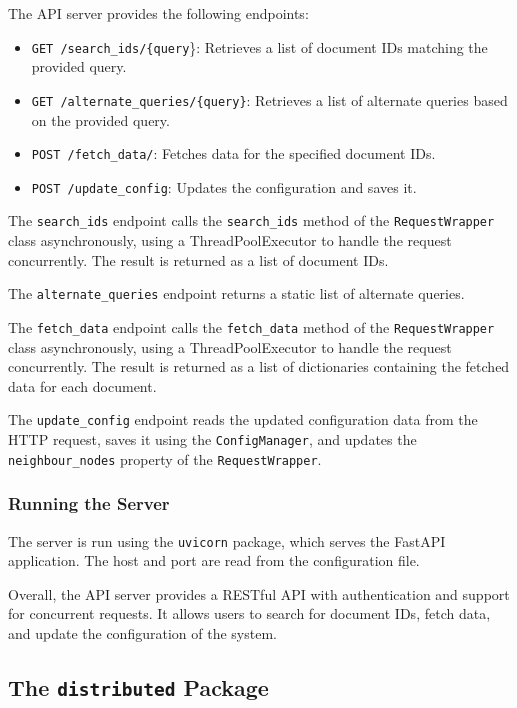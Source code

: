 \documentclass{article}
\begin{document}
The API server provides the following endpoints:

\begin{itemize}
    \item \texttt{GET /search\_ids/\{query}\}: Retrieves a list of document IDs matching the 
    provided query.
    \item \texttt{GET /alternate\_queries/\{query\}}: Retrieves a list of alternate queries 
    based on the provided query.
    \item \texttt{POST /fetch\_data/}: Fetches data for the specified document IDs.
    \item \texttt{POST /update\_config}: Updates the configuration and saves it.
\end{itemize}

The \texttt{search\_ids} endpoint calls the \texttt{search\_ids} method of the 
\texttt{RequestWrapper} class asynchronously, using a ThreadPoolExecutor to handle the request 
concurrently. The result is returned as a list of document IDs.

The \texttt{alternate\_queries} endpoint returns a static list of alternate queries.

The \texttt{fetch\_data} endpoint calls the \texttt{fetch\_data} method of the 
\texttt{RequestWrapper} class asynchronously, using a ThreadPoolExecutor to handle the request 
concurrently. The result is returned as a list of dictionaries containing the fetched data for 
each document.

The \texttt{update\_config} endpoint reads the updated configuration data from the HTTP request, 
saves it using the \texttt{ConfigManager}, and updates the \texttt{neighbour\_nodes} property of 
the \texttt{RequestWrapper}.

\subsubsection{Running the Server}

The server is run using the \texttt{uvicorn} package, which serves the FastAPI application. The 
host and port are read from the configuration file.

Overall, the API server provides a RESTful API with authentication and support for concurrent 
requests. It allows users to search for document IDs, fetch data, and update the configuration 
of the system.

\subsection{The \texttt{distributed} Package}
\end{document}

